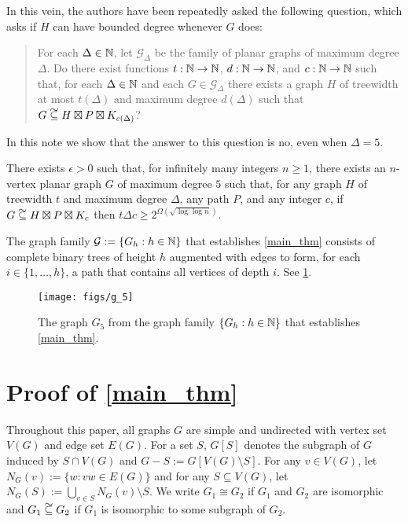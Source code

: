 \documentclass{patmorin}
\newcommand\subsetcong{\mathrel{\text{%
    \setbox0\hbox{$\subseteq$}%
    \rlap{\hbox to \wd0{\hss\hss\hss\raisebox{1.5\height}{$\sim$}\hss}}\box0
}}}
\renewcommand{\ge}{\geqslant}
\begin{document}
In this vein, the authors have been repeatedly asked the following question, which asks if $H$ can have bounded degree whenever $G$ does:
\begin{quote}
  For each $\Delta\in\mathbb{N}$, let $\mathcal{G}_\Delta$ be the family of planar graphs of maximum degree $\Delta$.  Do there exist functions $t:\mathbb{N}\to\mathbb{N}$, $d:\mathbb{N}\to\mathbb{N}$, and $c:\mathbb{N}\to\mathbb{N}$ such that, for each $\Delta\in\mathbb{N}$ and each $G\in\mathcal{G}_\Delta$ there exists a graph $H$ of treewidth at most $t(\Delta)$ and maximum degree $d(\Delta)$ such that $G\subsetcong H\boxtimes P\boxtimes K_{c(\Delta)}$?
\end{quote}
In this note we show that the answer to this question is no, even when $\Delta=5$.

\begin{thm}\label{main_thm}
  There exists $\epsilon > 0$ such that, for infinitely many integers $n\ge 1$, there exists an $n$-vertex planar graph $G$ of maximum degree $5$ such that, for any graph $H$ of treewidth $t$ and maximum degree $\Delta$, any path $P$, and any integer $c$, if $G\subsetcong H\boxtimes P\boxtimes K_c$ then $t\Delta c \ge 2^{\Omega(\sqrt{\log\log n})}$.
\end{thm}

The graph family $\mathcal{G}:=\{G_h:h\in\mathbb{N}\}$ that establishes \cref{main_thm} consists of complete binary trees of height $h$ augmented with edges to form, for each $i\in\{1,\ldots,h\}$, a path that contains all vertices of depth $i$.  See \cref{G_5}.

\begin{figure}
  \begin{center}
    \texttt{[image: figs/g\_5]}
  \end{center}
  \caption{The graph $G_5$ from the graph family $\{G_h:h\in\mathbb{N}\}$ that establishes \cref{main_thm}.}
  \label{G_5}
\end{figure}

\section{Proof of \cref{main_thm}}

Throughout this paper, all graphs $G$ are simple and undirected with vertex set $V(G)$ and edge set $E(G)$.  For a set $S$, $G[S]$ denotes the subgraph of $G$ induced by $S\cap V(G)$ and $G-S:=G[V(G)\setminus S]$.  For any $v\in V(G)$, let $N_G(v):=\{w:vw\in E(G)\}$ and for any $S\subseteq V(G)$, let $N_G(S):=\bigcup_{v\in S} N_G(v)\setminus S$.  We write $G_1\cong G_2$ if $G_1$ and $G_2$ are isomorphic and $G_1\subsetcong G_2$ if $G_1$ is isomorphic to some subgraph of $G_2$.
\end{document}

